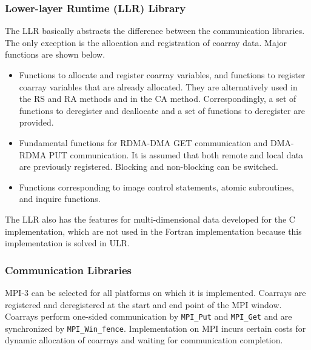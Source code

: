 \subsubsection{Lower-layer Runtime (LLR) Library}

The LLR basically abstracts the difference between the communication libraries.
The only exception is the allocation and registration of coarray data.
Major functions are shown below.

\begin{itemize}
\item
Functions to allocate and register coarray variables,
and functions to register coarray variables that are already allocated.
They are alternatively used in the RS and RA methods and in the CA method.
Correspondingly, a set of functions to deregister and deallocate and
a set of functions to deregister are provided.

\item
Fundamental functions for RDMA-DMA GET communication and DMA-RDMA PUT communication.
It is assumed that both remote and local data are previously registered.
Blocking and non-blocking can be switched.

\item
Functions corresponding to image control statements, atomic subroutines,
and inquire functions.

\end{itemize}

The LLR also has the features for multi-dimensional data developed for the C 
implementation, which are not used in the Fortran implementation because
this implementation is solved in ULR.


\subsubsection{Communication Libraries}

MPI-3 can be selected for all platforms on which it is implemented. Coarrays are 
registered and deregistered at the start and end point of the MPI window. 
Coarrays perform one-sided communication by {\tt MPI\_Put} and {\tt MPI\_Get}
and are synchronized by {\tt MPI\_Win\_fence}. 
Implementation on MPI incurs certain costs for dynamic allocation of coarrays and 
waiting for communication completion.

